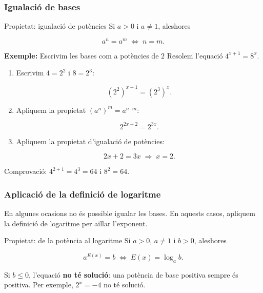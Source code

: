 \subsubsection{Igualació de bases}

\begin{propietat}{Propietat: igualació de potències}
Si $a>0$ i $a\neq 1$, aleshores

\[
a^n = a^m \;\Leftrightarrow\; n=m.
\]
\end{propietat}

\begin{exemple}{\textbf{Exemple:} Escrivim les bases com a potències de $2$}
Resolem l'equació $4^{x+1} = 8^x$.

\begin{enumerate}
\item Escrivim $4=2^2$ i $8=2^3$:

\[
\left(2^2\right)^{x+1} = \left(2^3\right)^x.
\]
\item Apliquem la propietat $(a^n)^m=a^{n\cdot m}$:

\[
2^{2x+2} = 2^{3x}.
\]
\item Apliquem la propietat d'igualació de potències:

\[
2x+2 = 3x \;\Rightarrow\; x=2.
\]
\end{enumerate}

Comprovació: $4^{2+1}=4^3=64$ i $8^2=64$.
\end{exemple}

\subsubsection{Aplicació de la definició de logaritme}

En algunes ocasions no és possible igualar les bases. En aquests casos, apliquem la definició de logaritme per aïllar l'exponent.

\begin{propietat}{Propietat: de la potència al logaritme}
Si $a>0$, $a\neq 1$ i $b>0$, aleshores

\[
a^{E(x)} = b \;\Leftrightarrow\; E(x) = \log_a b.
\]

Si $b\leq 0$, l'equació \textbf{no té solució}: una potència de base positiva sempre és positiva. Per exemple, $2^x=-4$ no té solució.
\end{propietat}

